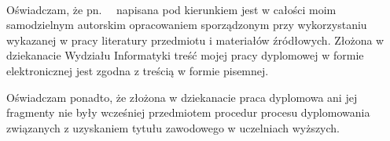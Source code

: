 %


\begin{center}
\noindent 
{{\color{blueZUT}\Large{}}}\\[1cm] 
\end{center}

\noindent Oświadczam, że \degreename {\ }pn.{\ }{\emph \ttitle}{\ }
napisana pod kierunkiem \supname  {\ }
jest w całości moim samodzielnym autorskim opracowaniem sporządzonym przy wykorzystaniu wykazanej w pracy literatury przedmiotu i materiałów źródłowych. 
Złożona w dziekanacie Wydziału Informatyki
treść  mojej pracy dyplomowej w formie elektronicznej jest zgodna z treścią w formie pisemnej.

\vspace{0.2cm}

\noindent Oświadczam ponadto, że złożona w dziekanacie praca dyplomowa ani jej fragmenty nie były wcześniej przedmiotem procedur procesu dyplomowania związanych z uzyskaniem tytułu zawodowego w uczelniach wyższych.

\vspace{3.5cm}

\dotfill %

\vspace{1.5cm}

